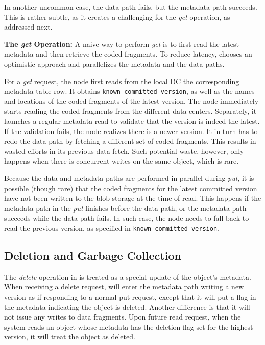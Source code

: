 In another uncommon case, the data path fails, but the metadata path succeeds.
This is rather subtle, as it creates a challenging for the {\em get} operation,
as addressed next.

{\bf The \emph{get} Operation:}
A naive way to perform {\em get} is to first read the latest metadata and then retrieve the coded fragments.
To reduce latency, {\name} chooses an optimistic approach and parallelizes the metadata and the data paths.

For a {\em get} request, the {\name} node first reads from the local DC the corresponding metadata table row.
It obtains {\tt known committed version}, as well as the names and locations of the coded fragments of the latest version.
The \name node immediately starts reading the coded fragments from the different data centers.
Separately, it launches a regular metadata read to validate that the version is indeed the latest.
If the validation fails, the \name node realizes there is a newer version.
It in turn has to redo the data path by fetching a different set of coded fragments.
This results in wasted efforts in its previous data fetch.
Such potential waste, however, only happens when there is concurrent writes on the same object,
which is rare.

Because the data and metadata paths are performed in parallel during {\em put},
it is possible (though rare) that the coded fragments for the latest committed version
have not been written to the blob storage at the time of read.
This happens if the metadata path in the {\em put} finishes before the data path,
or the metadata path succeeds while the data path fails.
In such case, the {\name} node needs to fall back to read the previous version,
as specified in {\tt known committed version}.


\subsection{Deletion and Garbage Collection}

The \emph{delete} operation in \name is treated as a special update of the
object's metadata. When receiving a delete request, \name will enter the
metadata path writing a new version as if responding to a normal put request,
except that it will put a flag in the metadata indicating the object is deleted.
Another difference is that it will not issue any writes to data fragments. Upon
future read request, when the system reads an object whose metadata has the
deletion flag set for the highest version, it will treat the object as deleted.

